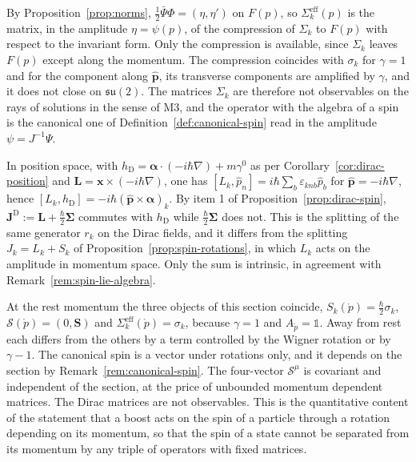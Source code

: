 By Proposition~\ref{prop:norms}, $\frac12\bar\Psi\Phi=(\eta,\eta')$ on $F(p)$, so $\Sigma_k^{\mathrm{eff}}(p)$ is the matrix, in the amplitude $\eta=\psi(p)$, of the compression of $\Sigma_k$ to $F(p)$ with respect to the invariant form. Only the compression is available, since $\Sigma_k$ leaves $F(p)$ except along the momentum. The compression coincides with $\sigma_k$ for $\gamma=1$ and for the component along $\hat{\mathbf{p}}$, its transverse components are amplified by $\gamma$, and it does not close on $\mathfrak{su}(2)$. The matrices $\Sigma_k$ are therefore not observables on the rays of solutions in the sense of M3, and the operator with the algebra of a spin is the canonical one of Definition~\ref{def:canonical-spin} read in the amplitude $\psi=J^{-1}\Psi$.

\begin{remark}\label{rem:spin-split}
	In position space, with $h_{\mathrm{D}}=\boldsymbol{\alpha}\cdot(-i\hbar\nabla)+m\gamma^0$ as per Corollary~\ref{cor:dirac-position} and $\mathbf{L}=\mathbf{x}\times(-i\hbar\nabla)$, one has $[L_k,\hat p_n]=i\hbar\sum_b\varepsilon_{knb}\hat p_b$ for $\hat{\mathbf{p}}=-i\hbar\nabla$, hence $[L_k,h_{\mathrm{D}}]=-i\hbar(\hat{\mathbf{p}}\times\boldsymbol{\alpha})_k$. By item 1 of Proposition~\ref{prop:dirac-spin}, $\mathbf{J}^{\mathrm{D}}:=\mathbf{L}+\frac\hbar2\boldsymbol{\Sigma}$ commutes with $h_{\mathrm{D}}$ while $\frac\hbar2\boldsymbol{\Sigma}$ does not. This is the splitting of the same generator $r_k$ on the Dirac fields, and it differs from the splitting $J_k=L_k+S_k$ of Proposition~\ref{prop:spin-rotations}, in which $L_k$ acts on the amplitude in momentum space. Only the sum is intrinsic, in agreement with Remark~\ref{rem:spin-lie-algebra}.
\end{remark}

\begin{remark}\label{rem:spin-summary}
	At the rest momentum the three objects of this section coincide, $S_k(\mathring{p})=\frac\hbar2\sigma_k$, $\mathcal{S}(\mathring{p})=(0,\mathbf{S})$ and $\Sigma_k^{\mathrm{eff}}(\mathring{p})=\sigma_k$, because $\gamma=1$ and $A_{\mathring{p}}=\mathbb{1}$. Away from rest each differs from the others by a term controlled by the Wigner rotation or by $\gamma-1$. The canonical spin is a vector under rotations only, and it depends on the section by Remark~\ref{rem:canonical-spin}. The four-vector $\mathcal{S}^\mu$ is covariant and independent of the section, at the price of unbounded momentum dependent matrices. The Dirac matrices are not observables. This is the quantitative content of the statement that a boost acts on the spin of a particle through a rotation depending on its momentum, so that the spin of a state cannot be separated from its momentum by any triple of operators with fixed matrices.
\end{remark}


